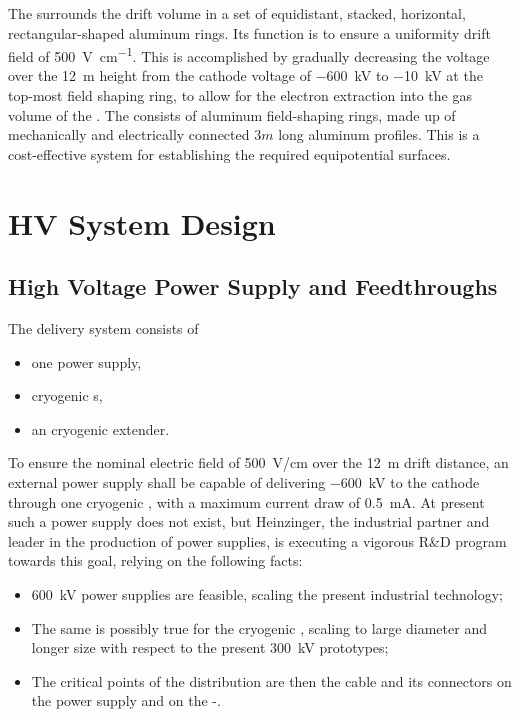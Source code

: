 The \fc surrounds the drift volume in a set of equidistant, stacked, horizontal, rectangular-shaped aluminum rings. Its function is to ensure a uniformity drift field of \SI{500}{\V\per\cm}. This is accomplished by gradually decreasing the voltage over the \SI{12}{\m} height from the cathode voltage of \SI{-600}{\kV} to \SI{-10}{\kV} at the top-most field shaping ring, to allow for the electron extraction into the gas volume of the . The \fc consists of aluminum field-shaping rings, made up of mechanically and electrically connected $3m$ long aluminum profiles.  
This is a cost-effective system for establishing the required equipotential surfaces. 

\section{HV System Design}
\label{sec:fddp-hv-design}

\subsection {High Voltage Power Supply and Feedthroughs}
The  delivery system consists of
\begin{itemize}
\item one power supply,
\item \hv cryogenic \fdth{}s,
\item an \hv cryogenic extender.
\end{itemize}

To ensure the nominal electric field of \SI{500}{V/cm} over  the \SI{12}{\m} drift distance, an external power supply shall be capable of delivering \SI{-600}{\kV} to  the cathode through one \hv cryogenic \fdth, with a maximum current draw of \SI{0.5}{\milli\ampere}.
At present such a power supply does not exist, but  Heinzinger, the industrial partner and leader in the production of \hv power supplies, is executing a vigorous R\&D program towards this goal, relying on the following facts:

\begin{itemize}
\item \SI{600}{\kV} power supplies are feasible, scaling the present industrial technology;
\item The same is possibly true for the \hv cryogenic \fdth, scaling to large diameter and longer size with respect to the present \SI{300}{\kV} prototypes;
\item The critical points of the \hv distribution are then the cable and its connectors on the power supply and on the \hv{}-\fdth. 
\end{itemize}

